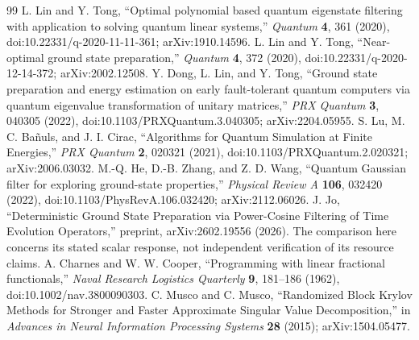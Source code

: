 \documentclass[11pt]{article}
\begin{document}
\begin{thebibliography}{99}
 L. Lin and Y. Tong, ``Optimal polynomial based quantum eigenstate filtering with application to solving quantum linear systems,'' \emph{Quantum} \textbf{4}, 361 (2020), doi:10.22331/q-2020-11-11-361; arXiv:1910.14596.
 L. Lin and Y. Tong, ``Near-optimal ground state preparation,'' \emph{Quantum} \textbf{4}, 372 (2020), doi:10.22331/q-2020-12-14-372; arXiv:2002.12508.
 Y. Dong, L. Lin, and Y. Tong, ``Ground state preparation and energy estimation on early fault-tolerant quantum computers via quantum eigenvalue transformation of unitary matrices,'' \emph{PRX Quantum} \textbf{3}, 040305 (2022), doi:10.1103/PRXQuantum.3.040305; arXiv:2204.05955.
 S. Lu, M. C. Ba\~nuls, and J. I. Cirac, ``Algorithms for Quantum Simulation at Finite Energies,'' \emph{PRX Quantum} \textbf{2}, 020321 (2021), doi:10.1103/PRXQuantum.2.020321; arXiv:2006.03032.
 M.-Q. He, D.-B. Zhang, and Z. D. Wang, ``Quantum Gaussian filter for exploring ground-state properties,'' \emph{Physical Review A} \textbf{106}, 032420 (2022), doi:10.1103/PhysRevA.106.032420; arXiv:2112.06026.
 J. Jo, ``Deterministic Ground State Preparation via Power-Cosine Filtering of Time Evolution Operators,'' preprint, arXiv:2602.19556 (2026). The comparison here concerns its stated scalar response, not independent verification of its resource claims.
 A. Charnes and W. W. Cooper, ``Programming with linear fractional functionals,'' \emph{Naval Research Logistics Quarterly} \textbf{9}, 181--186 (1962), doi:10.1002/nav.3800090303.
 C. Musco and C. Musco, ``Randomized Block Krylov Methods for Stronger and Faster Approximate Singular Value Decomposition,'' in \emph{Advances in Neural Information Processing Systems} \textbf{28} (2015); arXiv:1504.05477.
\end{thebibliography}
\end{document}
